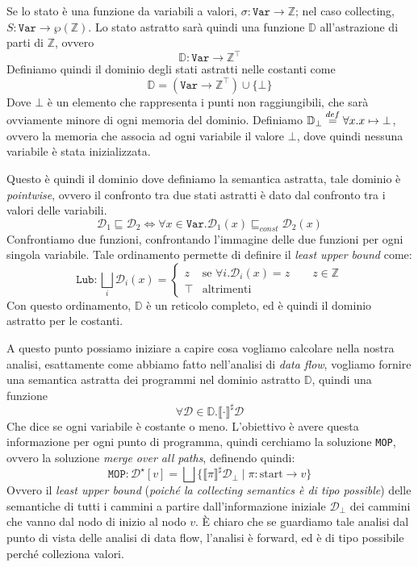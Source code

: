 Se lo stato è una funzione da variabili a valori, $\sigma : \texttt{Var} \to \mathbb{Z}$; 
nel caso collecting, $S : \texttt{Var} \to \wp(\mathbb{Z})$. Lo stato astratto sarà quindi
una funzione $\mathbb{D}$ all'astrazione di parti di $\mathbb{Z}$, ovvero 
\[
    \mathbb{D} : \texttt{Var} \to \mathbb{Z}^\top 
\]
Definiamo quindi il dominio degli stati astratti nelle costanti come 
\[
    \mathbb{D} = (\texttt{Var} \to \mathbb{Z}^\top) \cup \{\bot\}
\] 
Dove $\bot$ è un elemento che rappresenta i punti non raggiungibili, che sarà ovviamente minore 
di ogni memoria del dominio.
Definiamo $\mathbb{D}_\bot \stackrel{\tiny def}{=} \forall x . x \mapsto \bot$, ovvero la memoria 
che associa ad ogni variabile il valore $\bot$, dove quindi nessuna variabile è stata inizializzata.

Questo è quindi il dominio dove definiamo la semantica astratta, tale dominio è \textit{pointwise},
ovvero il confronto tra due stati astratti è dato dal confronto tra i valori delle variabili.
\[
    \mathcal{D}_1 \sqsubseteq \mathcal{D}_2 \iff \forall x \in \texttt{Var} . 
    \mathcal{D}_1(x) \sqsubseteq_{const} \mathcal{D}_2(x)
\]
Confrontiamo due funzioni, confrontando l'immagine delle due funzioni per ogni singola 
variabile. Tale ordinamento permette di definire il \textit{least upper bound} come:
\[
    \texttt{Lub} : \bigsqcup_i \mathcal{D}_i(x) =
    \begin{cases}
        z & \text{se } \forall i . \mathcal{D}_i(x) = z \qquad z \in \mathbb{Z} \\
        \top & \text{altrimenti}
    \end{cases}
\]
Con questo ordinamento, $\mathbb{D}$ è un reticolo completo, ed è quindi il dominio
astratto per le costanti.

A questo punto possiamo iniziare a capire cosa vogliamo calcolare nella nostra analisi,
esattamente come abbiamo fatto nell'analisi di \textit{data flow}, vogliamo fornire una 
semantica astratta dei programmi nel dominio astratto $\mathbb{D}$, quindi una funzione
\[
\forall \mathcal{D} \in \mathbb{D} . \llbracket \cdot \rrbracket^\sharp \mathcal{D}
\]
Che dice se ogni variabile è costante o meno. L'obiettivo è avere questa informazione 
per ogni punto di programma, quindi cerchiamo la soluzione \texttt{MOP}, ovvero la
soluzione \textit{merge over all paths}, definendo quindi:
\[
    \texttt{MOP} : \mathcal{D}^\star [v] = \bigsqcup 
    \{ \llbracket \pi \rrbracket^\sharp \mathcal{D}_\bot \mid \pi:\text{start} \to v \}
\]
Ovvero il \textit{least upper bound}  (\textit{poiché la collecting semantics è di tipo possible}) 
delle semantiche di tutti i cammini a partire dall'informazione iniziale $\mathcal{D}_\bot$
dei cammini 
che vanno dal nodo di inizio al nodo $v$. È chiaro che se guardiamo tale analisi dal punto di vista delle 
analisi di data flow, l'analisi è forward, ed è di tipo possibile perché colleziona valori.


